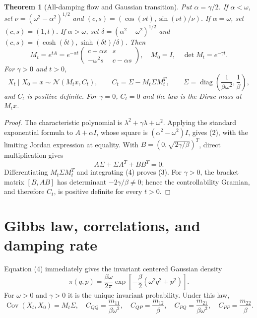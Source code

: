 \documentclass[10pt]{article}
\newtheorem{theorem}{Theorem}
\newcommand{\Cov}{\operatorname{Cov}}
\begin{document}
\begin{theorem}[All-damping flow and Gaussian transition]\label{thm:flow}
Put $\alpha=\gamma/2$.  If $\alpha<\omega$, set
$\nu=(\omega^2-\alpha^2)^{1/2}$ and
$(c,s)=(\cos(\nu t),\sin(\nu t)/\nu)$.  If $\alpha=\omega$, set
$(c,s)=(1,t)$.  If $\alpha>\omega$, set
$\delta=(\alpha^2-\omega^2)^{1/2}$ and
$(c,s)=(\cosh(\delta t),\sinh(\delta t)/\delta)$.  Then
\begin{equation}
M_t=e^{tA}=e^{-\alpha t}
\begin{pmatrix}c+\alpha s&s\\-\omega^2s&c-\alpha s\end{pmatrix},
\quad M_0=I,\quad \det M_t=e^{-\gamma t}. \tag{2}
\end{equation}
For $\gamma>0$ and $t>0$,
\begin{equation}
X_t\mid X_0=x\sim\mathcal N(M_tx,C_t),\qquad
C_t=\Sigma-M_t\Sigma M_t^T,\qquad
\Sigma=\operatorname{diag}\!\left(\frac1{\beta\omega^2},\frac1\beta\right), \tag{3}
\end{equation}
and $C_t$ is positive definite.  For $\gamma=0$, $C_t=0$ and the law is
the Dirac mass at $M_tx$.
\end{theorem}
\begin{proof}
The characteristic polynomial is
$\lambda^2+\gamma\lambda+\omega^2$.  Applying the standard exponential
formula to $A+\alpha I$, whose square is
$(\alpha^2-\omega^2)I$, gives (2), with the limiting Jordan expression at
equality.  With $B=(0,\sqrt{2\gamma/\beta})^T$, direct multiplication gives
\begin{equation}
A\Sigma+\Sigma A^T+BB^T=0. \tag{4}
\end{equation}
Differentiating $M_t\Sigma M_t^T$ and integrating (4) proves (3).  For
$\gamma>0$, the bracket matrix $[B,AB]$ has determinant
$-2\gamma/\beta\ne0$; hence the controllability Gramian, and therefore
$C_t$, is positive definite for every $t>0$.
\end{proof}

\section{Gibbs law, correlations, and damping rate}
Equation (4) immediately gives the invariant centered Gaussian density
\begin{equation}
\pi(q,p)=\frac{\beta\omega}{2\pi}
\exp\!\left[-\frac\beta2(\omega^2q^2+p^2)\right]. \tag{5}
\end{equation}
For $\omega>0$ and $\gamma>0$ it is the unique invariant probability.  Under
this law,
\begin{equation}
\Cov(X_t,X_0)=M_t\Sigma,\quad
C_{QQ}=\frac{m_{11}}{\beta\omega^2},\quad C_{QP}=\frac{m_{12}}\beta,
\quad C_{PQ}=\frac{m_{21}}{\beta\omega^2},\quad C_{PP}=\frac{m_{22}}\beta. \tag{6}
\end{equation}
\end{document}
